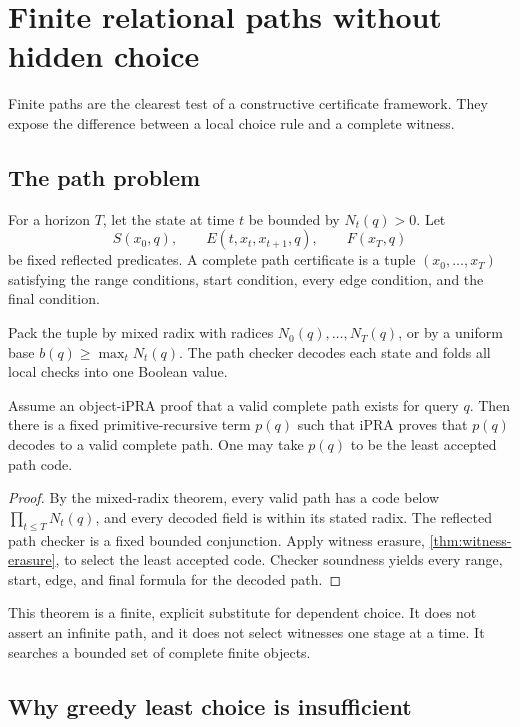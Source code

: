 \section{Finite relational paths without hidden choice}

Finite paths are the clearest test of a constructive certificate framework.
They expose the difference between a local choice rule and a complete witness.

\subsection{The path problem}

For a horizon \(T\), let the state at time \(t\) be bounded by
\(N_t(q)>0\).  Let
\[
  S(x_0,q),\qquad
  E(t,x_t,x_{t+1},q),\qquad
  F(x_T,q)
\]
be fixed reflected predicates.  A complete path certificate is a tuple
\((x_0,\ldots,x_T)\) satisfying the range conditions, start condition, every
edge condition, and the final condition.

Pack the tuple by mixed radix with radices \(N_0(q),\ldots,N_T(q)\), or by a
uniform base \(b(q)\ge\max_tN_t(q)\).  The path checker decodes each state and
folds all local checks into one Boolean value.

\begin{theorem}\label{thm:whole-path}
Assume an object-iPRA proof that a valid complete path exists for query \(q\).
Then there is a fixed primitive-recursive term \(p(q)\) such that iPRA proves
that \(p(q)\) decodes to a valid complete path.  One may take \(p(q)\) to be
the least accepted path code.
\end{theorem}

\begin{proof}
By the mixed-radix theorem, every valid path has a code below
\(\prod_{t\le T}N_t(q)\), and every decoded field is within its stated radix.
The reflected path checker is a fixed bounded conjunction.  Apply witness
erasure, \cref{thm:witness-erasure}, to select the least accepted code.
Checker soundness yields every range, start, edge, and final formula for the
decoded path.
\end{proof}

This theorem is a finite, explicit substitute for dependent choice.  It does
not assert an infinite path, and it does not select witnesses one stage at a
time.  It searches a bounded set of complete finite objects.

\subsection{Why greedy least choice is insufficient}

